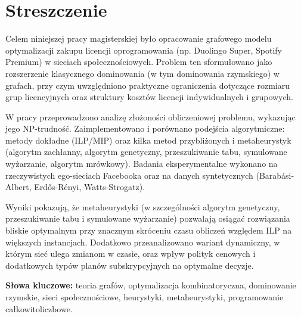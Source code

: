 \section*{Streszczenie}

Celem niniejszej pracy magisterskiej było opracowanie grafowego modelu optymalizacji zakupu licencji oprogramowania (np. Duolingo Super, Spotify Premium) w sieciach społecznościowych. Problem ten sformułowano jako rozszerzenie klasycznego dominowania (w tym dominowania rzymskiego) w grafach, przy czym uwzględniono praktyczne ograniczenia dotyczące rozmiaru grup licencyjnych oraz struktury kosztów licencji indywidualnych i grupowych.

W pracy przeprowadzono analizę złożoności obliczeniowej problemu, wykazując jego NP-trudność. Zaimplementowano i porównano podejścia algorytmiczne: metody dokładne (ILP/MIP) oraz kilka metod przybliżonych i metaheurystyk (algorytm zachłanny, algorytm genetyczny, przeszukiwanie tabu, symulowane wyżarzanie, algorytm mrówkowy). Badania eksperymentalne wykonano na rzeczywistych ego-sieciach Facebooka oraz na danych syntetycznych (Barabási-Albert, Erdős-Rényi, Watts-Strogatz).

Wyniki pokazują, że metaheurystyki (w szczególności algorytm genetyczny, przeszukiwanie tabu i symulowane wyżarzanie) pozwalają osiągać rozwiązania bliskie optymalnym przy znacznym skróceniu czasu obliczeń względem ILP na większych instancjach. Dodatkowo przeanalizowano wariant dynamiczny, w którym sieć ulega zmianom w czasie, oraz wpływ polityk cenowych i dodatkowych typów planów subskrypcyjnych na optymalne decyzje.

\textbf{Słowa kluczowe:} teoria grafów, optymalizacja kombinatoryczna, dominowanie rzymskie, sieci społecznościowe, heurystyki, metaheurystyki, programowanie całkowitoliczbowe.

